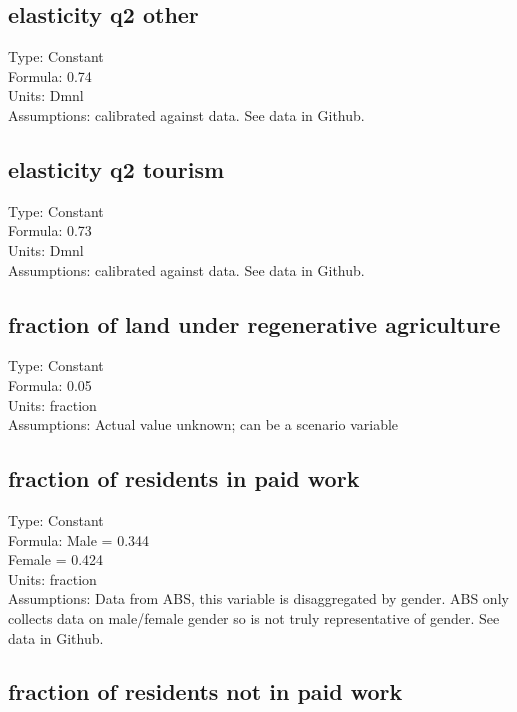 \documentclass[
  11pt,
]{book}
\begin{document}
\hypertarget{elasticity-q2-other}{%
\subsection{elasticity q2 other}\label{elasticity-q2-other}}

Type: Constant\\
Formula: 0.74\\
Units: Dmnl\\
Assumptions: calibrated against data. See data in Github.

\hypertarget{elasticity-q2-tourism}{%
\subsection{elasticity q2 tourism}\label{elasticity-q2-tourism}}

Type: Constant\\
Formula: 0.73\\
Units: Dmnl\\
Assumptions: calibrated against data. See data in Github.

\hypertarget{fraction-of-land-under-regenerative-agriculture}{%
\subsection{fraction of land under regenerative agriculture}\label{fraction-of-land-under-regenerative-agriculture}}

Type: Constant\\
Formula: 0.05\\
Units: fraction\\
Assumptions: Actual value unknown; can be a scenario variable

\hypertarget{fraction-of-residents-in-paid-work}{%
\subsection{fraction of residents in paid work}\label{fraction-of-residents-in-paid-work}}

Type: Constant\\
Formula: Male = 0.344\\
Female = 0.424\\
Units: fraction\\
Assumptions: Data from ABS, this variable is disaggregated by gender. ABS only collects data on male/female gender so is not truly representative of gender. See data in Github.

\hypertarget{fraction-of-residents-not-in-paid-work}{%
\subsection{fraction of residents not in paid work}\label{fraction-of-residents-not-in-paid-work}}
\end{document}
